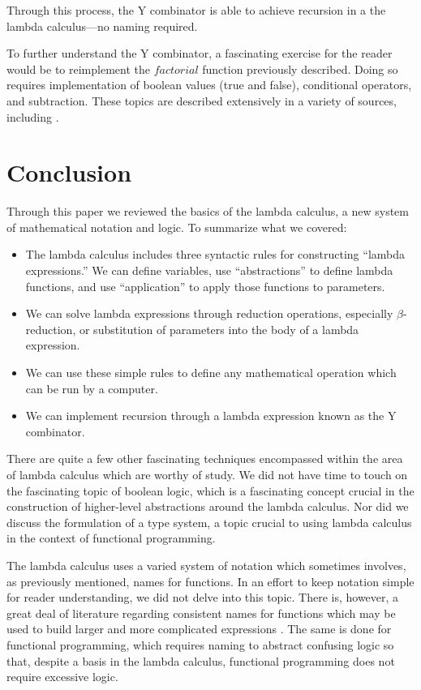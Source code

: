 \documentclass[twocolumn,titlepage,12pt]{article}
\begin{document}
Through this process, the Y combinator is able to achieve recursion in a the lambda calculus---no naming required.

To further understand the Y combinator, a fascinating exercise for the reader would be to reimplement the $factorial$ function previously described. Doing so requires implementation of boolean values (true and false), conditional operators, and subtraction. These topics are described extensively in a variety of sources, including \cite{stanfordlc}\cite{cornelllc}.

\section{Conclusion}
Through this paper we reviewed the basics of the lambda calculus, a new system of mathematical notation and logic. To summarize what we covered:
\begin{itemize}
  \item{The lambda calculus includes three syntactic rules for constructing ``lambda expressions.'' We can define variables, use ``abstractions'' to define lambda functions, and use ``application'' to apply those functions to parameters.}
  \item{We can solve lambda expressions through reduction operations, especially $\beta$-reduction, or substitution of parameters into the body of a lambda expression.}
  \item{We can use these simple rules to define any mathematical operation which can be run by a computer.}
  \item{We can implement recursion through a lambda expression known as the Y combinator.}
\end{itemize}
There are quite a few other fascinating techniques encompassed within the area of lambda calculus which are worthy of study. We did not have time to touch on the fascinating topic of boolean logic, which is a fascinating concept crucial in the construction of higher-level abstractions around the lambda calculus. Nor did we discuss the formulation of a type system, a topic crucial to using lambda calculus in the context of functional programming.

The lambda calculus uses a varied system of notation which sometimes involves, as previously mentioned, names for functions. In an effort to keep notation simple for reader understanding, we did not delve into this topic. There is, however, a great deal of literature regarding consistent names for functions which may be used to build larger and more complicated expressions \cite{stanfordlc}. The same is done for functional programming, which requires naming to abstract confusing logic so that, despite a basis in the lambda calculus, functional programming does not require excessive logic.
\end{document}
